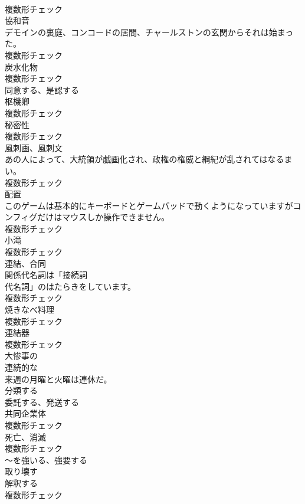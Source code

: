 \documentclass[8pt]{extreport}
\begin{document}
\begin{CJK}{UTF8}{min}
\\	複数形チェック
\\	[名詞]	協和音	
\\	デモインの裏庭、コンコードの居間、チャールストンの玄関からそれは始まった。	
\\	複数形チェック
\\	[名詞]	炭水化物	
\\	複数形チェック
\\	[動詞]	同意する、是認する	
\\	[名詞]	枢機卿	
\\	複数形チェック
\\	[名詞]	秘密性	
\\	複数形チェック
\\	[名詞]	風刺画、風刺文	
\\	あの人によって、大統領が戯画化され、政権の権威と綱紀が乱されてはなるまい。	
\\	複数形チェック
\\	[名詞]	配置	
\\	このゲームは基本的にキーボードとゲームパッドで動くようになっていますがコンフィグだけはマウスしか操作できません。	
\\	複数形チェック
\\	[名詞]	小滝	
\\	複数形チェック
\\	[名詞]	連結、合同	
\\	関係代名詞は「接続詞
\\	代名詞」のはたらきをしています。	
\\	複数形チェック
\\	[名詞]	焼きなべ料理	
\\	複数形チェック
\\	[名詞]	連結器	
\\	複数形チェック
\\	[形容詞]	大惨事の	
\\	[形容詞]	連続的な	
\\	来週の月曜と火曜は連休だ。	
\\	[動詞]	分類する	
\\	[動詞]	委託する、発送する	
\\	[名詞]	共同企業体	
\\	複数形チェック
\\	[名詞]	死亡、消滅	
\\	複数形チェック
\\	[動詞]	〜を強いる、強要する	
\\	[動詞]	取り壊す	
\\	[名詞]	解釈する	
\\	複数形チェック

\end{CJK}
\end{document}
